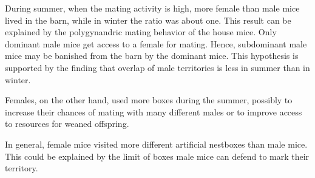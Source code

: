During summer, when the mating activity is high, more female than male mice lived in the barn, while in winter the ratio was about one. This result can be explained by the polygynandric mating behavior of the house mice. Only dominant male mice get access to a female for mating. Hence, subdominant male mice may be banished from the barn by the dominant mice. This hypothesis is supported by the finding that overlap of male territories is less in summer than in winter. 
 
Females, on the other hand, used more boxes during the summer, possibly to increase their chances of mating with many different males or to improve access to resources for weaned offspring.
 
In general, female mice visited more different artificial nestboxes than male mice. This could be explained by the limit of boxes male mice can defend to mark their territory.